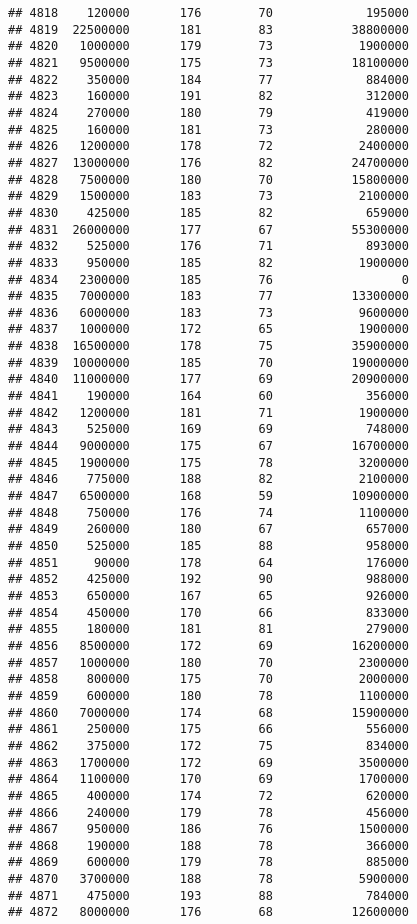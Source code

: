 \documentclass[
]{article}
\begin{document}
\begin{verbatim}
## 4818    120000       176        70             195000
## 4819  22500000       181        83           38800000
## 4820   1000000       179        73            1900000
## 4821   9500000       175        73           18100000
## 4822    350000       184        77             884000
## 4823    160000       191        82             312000
## 4824    270000       180        79             419000
## 4825    160000       181        73             280000
## 4826   1200000       178        72            2400000
## 4827  13000000       176        82           24700000
## 4828   7500000       180        70           15800000
## 4829   1500000       183        73            2100000
## 4830    425000       185        82             659000
## 4831  26000000       177        67           55300000
## 4832    525000       176        71             893000
## 4833    950000       185        82            1900000
## 4834   2300000       185        76                  0
## 4835   7000000       183        77           13300000
## 4836   6000000       183        73            9600000
## 4837   1000000       172        65            1900000
## 4838  16500000       178        75           35900000
## 4839  10000000       185        70           19000000
## 4840  11000000       177        69           20900000
## 4841    190000       164        60             356000
## 4842   1200000       181        71            1900000
## 4843    525000       169        69             748000
## 4844   9000000       175        67           16700000
## 4845   1900000       175        78            3200000
## 4846    775000       188        82            2100000
## 4847   6500000       168        59           10900000
## 4848    750000       176        74            1100000
## 4849    260000       180        67             657000
## 4850    525000       185        88             958000
## 4851     90000       178        64             176000
## 4852    425000       192        90             988000
## 4853    650000       167        65             926000
## 4854    450000       170        66             833000
## 4855    180000       181        81             279000
## 4856   8500000       172        69           16200000
## 4857   1000000       180        70            2300000
## 4858    800000       175        70            2000000
## 4859    600000       180        78            1100000
## 4860   7000000       174        68           15900000
## 4861    250000       175        66             556000
## 4862    375000       172        75             834000
## 4863   1700000       172        69            3500000
## 4864   1100000       170        69            1700000
## 4865    400000       174        72             620000
## 4866    240000       179        78             456000
## 4867    950000       186        76            1500000
## 4868    190000       188        78             366000
## 4869    600000       179        78             885000
## 4870   3700000       188        78            5900000
## 4871    475000       193        88             784000
## 4872   8000000       176        68           12600000
\end{verbatim}
\end{document}
